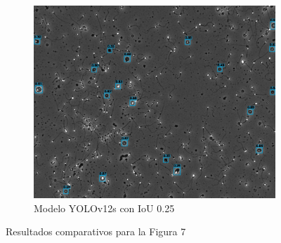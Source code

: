 \documentclass[12pt,a4paper,onecolumn,oneside]{report}
\begin{document}
\begin{figure}[H]
  \vspace{0.3cm}
  \begin{subfigure}[b]{0.48\textwidth}
    \centering
    \includegraphics[width=\textwidth]{figuras/evaluacion_cualitativa/7/7_v12_IoU0.25.jpg}
    \caption{Modelo YOLOv12s con IoU 0.25}
    \label{figyolov12s_IoU0.25_image_7}
  \end{subfigure}
  
  \caption{Resultados comparativos para la Figura 7}
  \label{fig:7}
\end{figure}
\end{document}
